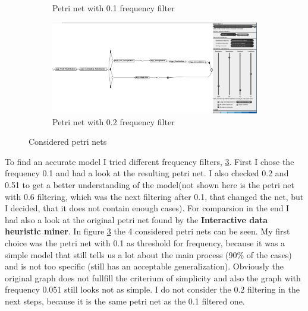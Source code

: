 \begin{figure}[!htbp]
\begin{subfigure}{.4\textwidth}
  \caption{Petri net with 0.1 frequency filter}
  \label{fig:APP_DFG0-1}
\end{subfigure}
\begin{subfigure}{.4\textwidth}
  \centering
  \includegraphics[width=\linewidth]{App_DirectlyFollowedFreq0-2.PNG}
  \caption{Petri net with 0.2 frequency filter}
  \label{fig:APP_DFG0-2}
\end{subfigure}
\caption{Considered petri nets}
\label{fig:App_Direct}
\end{figure}

To find an accurate model I tried different frequency filters, \ref{fig:App_Direct}. First I chose the frequency 0.1 and had a look at the resulting petri net. I also checked 0.2 and 0.51 to get a better understanding of the model(not shown here is the petri net with 0.6 filtering, which was the next filtering after 0.1, that changed the net, but I decided, that it does not contain enough cases). For comparsion in the end I had also a look at the original petri net found by the \textbf{Interactive data heuristic miner}. In figure \ref{fig:App_Direct} the 4 considered petri nets can be seen. My first choice was the petri net with 0.1 as threshold for frequency, because it was a simple model that still tells us a lot about the main process (90\% of the cases) and is not too specific (still has an acceptable generalization). Obviously the original graph does not fullfill the criterium of simplicity and also the graph with frequency 0.051 still looks not as simple. I do not consider the 0.2 filtering in the next steps, because it is the same petri net as the 0.1 filtered one.

